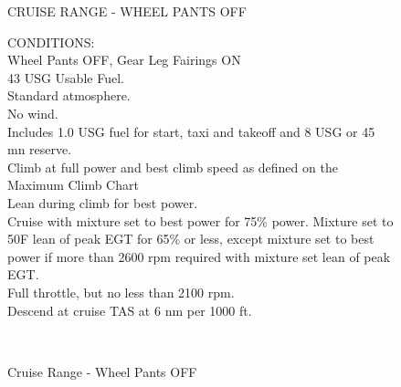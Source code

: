 \begin{figure}[t]
\begin{center}
\begin{perfhdr}CRUISE RANGE - WHEEL PANTS OFF\\
\end{perfhdr}

\begin{minipage}{5in}
  \begin{flushleft}
    CONDITIONS:\\
    Wheel Pants OFF, Gear Leg Fairings ON\\
    43 USG Usable Fuel.\\
    Standard atmosphere.\\
    No wind.\\
    Includes 1.0 USG fuel for start, taxi and takeoff and 8 USG or 45 mn reserve.\\
    Climb at full power and best climb speed as defined on the Maximum Climb Chart\\
    Lean during climb for best power.\\
    Cruise with mixture set to best power for 75\% power.  Mixture set to 50\textdegree F lean of peak EGT for 65\% or less, except mixture set to best power if more than 2600 rpm required with mixture set lean of peak EGT.\\
    Full throttle, but no less than 2100 rpm.\\
    Descend at cruise TAS at 6 nm per 1000 ft.\\
    \end{flushleft}
\end{minipage}\\
\vspace{5ex}
\end{center}  %
\caption{Cruise Range - Wheel Pants OFF}
\label{Cruise-range-WP-OFF}
\end{figure}
\clearpage


